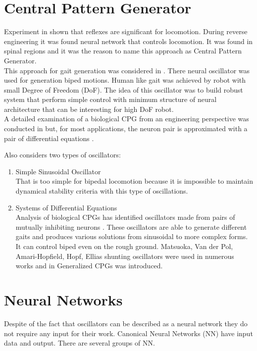 \documentclass[11pt,a4paper]{report}
\begin{document}
\section{Central Pattern Generator}

Experiment in \cite{grillner1975locomotion} shown that reflexes are significant for locomotion. During reverse engineering it was found neural network that controls locomotion. It was found in spinal regions and it was the reason to name this approach as Central Pattern Generator.\\
This approach for gait generation was considered in \cite{miyakoshi1998three}. There neural oscillator was used for generation biped motions. Human like gait was achieved by robot with small Degree of Freedom (DoF). The idea of this oscillator was to build robust system that perform simple control with minimum structure of neural architecture that can be interesting for high DoF robot.\\
A detailed examination of a biological CPG from an engineering perspective was conducted in \cite{zhu2006central} but, for most applications, the neuron pair is approximated with a pair of differential equations \cite{wright2014intelligent}.

Also \cite{wright2014intelligent} considers two types of oscillators:

\begin{enumerate}
	\item Simple Sinusoidal Oscillator\\
	That is too simple for bipedal locomotion because it is impossible to maintain dynamical stability criteria with this type of oscillations.
	\item Systems of Differential Equations\\
	Analysis of biological CPGs has identified oscillators made from pairs of mutually inhibiting neurons \cite{grillner1995neural}. These oscillators are able to generate different gaits and produces various solutions from sinusoidal to more complex forms. It can control biped even on the rough ground. Matsuoka, Van der Pol, Amari-Hopfield, Hopf, Ellias shunting oscillators were used in numerous works and in \cite{lee2007construction} Generalized CPGs was introduced. 
\end{enumerate} 

\section{Neural Networks}
Despite of the fact that oscillators can be described as a neural network they do not require any input for their work. Canonical Neural Networks (NN) have input data and output. There are several groups of NN.
\end{document}

